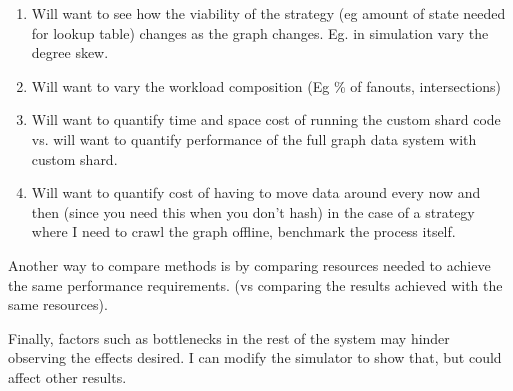 \documentclass{article}
\begin{document}
\begin{enumerate}
\item Will want to see how the viability of the strategy (eg amount of state needed for lookup table) changes as the graph changes. Eg. in simulation vary the degree skew.
\item Will want to vary the workload composition (Eg \% of fanouts, intersections)
\item Will want to quantify time and space cost of running the custom shard code vs. will want to quantify performance of the full graph data system  with custom shard.
\item Will want to quantify cost of having to move data around every now and then (since you need this when you don't hash)
in the case of a strategy where I need to crawl the graph offline, benchmark the process itself.
\end{enumerate}

Another way to compare methods is by comparing resources needed to achieve the same  performance requirements. (vs comparing the results achieved with the same resources).

Finally, factors such as bottlenecks in the rest of the system may hinder observing the effects desired. I can modify the simulator to show that, but could affect other results.
\nocite{*}

\end{document}
